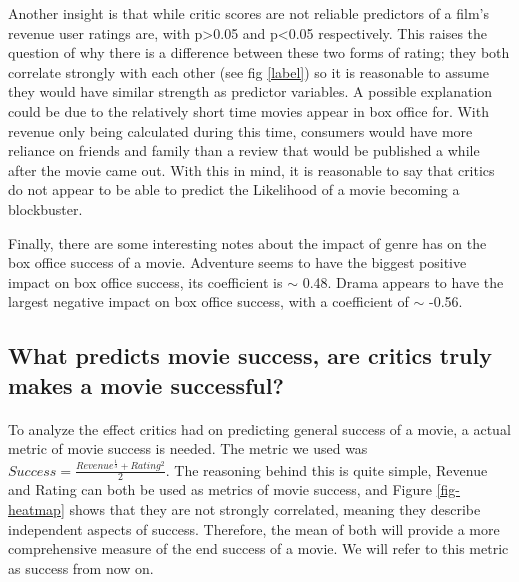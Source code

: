         Another insight is that while critic scores are not reliable predictors of a
            film's revenue user ratings are, with p>0.05 and p<0.05 respectively.
        This raises the question of why there is a difference between these two forms of rating; they both correlate
            strongly with each other (see fig \ref{label}) so it is reasonable to assume they would have similar 
            strength as predictor variables.
        A possible explanation could be due to the relatively short time movies appear in box office for.
        With revenue only being calculated during this time, consumers would have more reliance on friends
            and family than a review that would be published a while after the movie came out.
        With this in mind, it is reasonable to say that critics do not appear to be able to predict the Likelihood
            of a movie becoming a blockbuster.
        
        Finally, there are some interesting notes about the impact of genre has on the box office success of a movie.
        Adventure seems to have the biggest positive impact on box office success, its coefficient is $\sim$ 0.48.
        Drama appears to have the largest negative impact on box office success, with a coefficient of $\sim$ -0.56.
    \subsection{What predicts movie success, are critics truly  makes a movie successful?}
        \paragraph{}
        To analyze the effect critics had on predicting general success of a movie, a actual metric of movie success is
            needed.
        The metric we used was $Success = \frac{Revenue^\frac{1}{3} + Rating^2}{2}$.
        The reasoning behind this is quite simple, Revenue and Rating can both be used as metrics of movie success,
            and Figure \ref{fig-heatmap} shows that they are not strongly correlated, meaning they describe independent
            aspects of success. 
        Therefore, the mean of both will provide a more comprehensive measure of the end success of a movie.
        We will refer to this metric as success from now on.
        
